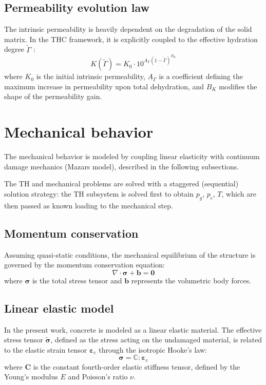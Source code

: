 \subsection{Permeability evolution law} \label{sec:perm-law}
The intrinsic permeability is heavily dependent on the degradation of the solid matrix. In the THC framework, it is explicitly coupled to the effective hydration degree $\tilde{\Gamma}$ \cite{sciume2024}:
\begin{equation}
    K(\tilde{\Gamma}) = K_0 \cdot 10^{A_\Gamma (1 - \tilde{\Gamma})^{B_K}}
\end{equation}
where $K_0$ is the initial intrinsic permeability, $A_\Gamma$ is a coefficient defining the maximum increase in permeability upon total dehydration, and $B_K$ modifies the shape of the permeability gain.

\section{Mechanical behavior} \label{sec:mechanical}

The mechanical behavior is modeled by coupling linear elasticity with continuum damage mechanics (Mazars model), described in the following subsections.

The TH and mechanical problems are solved with a staggered (sequential) solution strategy: the TH subsystem is solved first to obtain $p_g$, $p_c$, $T$, which are then passed as known loading to the mechanical step. 

\subsection{Momentum conservation}
Assuming quasi-static conditions, the mechanical equilibrium of the structure is governed by the momentum conservation equation:
\begin{equation}
    \nabla \cdot \boldsymbol{\sigma} + \mathbf{b} = \mathbf{0}
    \label{eq:final_momentum}
\end{equation}
where $\boldsymbol{\sigma}$ is the total stress tensor and $\mathbf{b}$ represents the volumetric body forces.

\subsection{Linear elastic model}

In the present work, concrete is modeled as a linear elastic material. The effective stress tensor $\tilde{\boldsymbol{\sigma}}$, defined as the stress acting on the undamaged material, is related to the elastic strain tensor $\boldsymbol{\varepsilon}_e$ through the isotropic Hooke's law: 
\begin{equation}
    \boldsymbol{\sigma} = \mathbb{C} : \boldsymbol{\varepsilon}_e
    \label{eq:hooke}
\end{equation}
where $\mathbf{C}$ is the constant fourth-order elastic stiffness tensor, defined by the Young's modulus $E$ and Poisson's ratio $\nu$.


